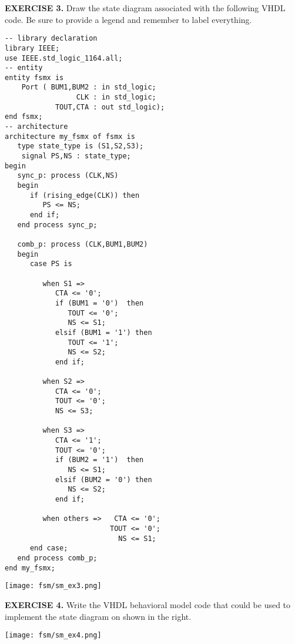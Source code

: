 \vspace{20pt}
\noindent
\begin{minipage}{1\textwidth}
\textbf{EXERCISE 3.}
Draw the state diagram associated with the following VHDL code. Be sure to provide a legend and remember to label everything.
\end{minipage}
\begin{minipage}{0.66\textwidth}
\vspace{10px}
\begin{lstlisting}
-- library declaration
library IEEE;
use IEEE.std_logic_1164.all;
-- entity
entity fsmx is
    Port ( BUM1,BUM2 : in std_logic;
                 CLK : in std_logic;
            TOUT,CTA : out std_logic);
end fsmx;
-- architecture
architecture my_fsmx of fsmx is
   type state_type is (S1,S2,S3); 
	signal PS,NS : state_type; 
begin
   sync_p: process (CLK,NS)
   begin
      if (rising_edge(CLK)) then   
         PS <= NS; 
      end if; 
   end process sync_p; 

   comb_p: process (CLK,BUM1,BUM2)
   begin
      case PS is 

         when S1 => 
            CTA <= '0'; 
            if (BUM1 = '0')  then 
               TOUT <= '0'; 
               NS <= S1; 
            elsif (BUM1 = '1') then 
               TOUT <= '1';  
               NS <= S2; 
            end if; 

         when S2 =>
            CTA <= '0'; 
            TOUT <= '0'; 
            NS <= S3;   

         when S3 =>
            CTA <= '1'; 
            TOUT <= '0';   
            if (BUM2 = '1')  then 
               NS <= S1; 
            elsif (BUM2 = '0') then 
               NS <= S2; 
            end if; 
      
         when others =>   CTA <= '0'; 
                         TOUT <= '0';
                           NS <= S1;
      end case; 
   end process comb_p; 
end my_fsmx;
\end{lstlisting}
\end{minipage}
\begin{minipage}{0.29\textwidth}
\texttt{[image: fsm/sm\_ex3.png]}
\vspace{250px}
\end{minipage}

\vspace{20pt}
\noindent
\begin{minipage}[t]{0.5\textwidth}
\textbf{EXERCISE 4.}
Write the VHDL behavioral model code that could be used to implement the state diagram on shown in the right.
\end{minipage}
\begin{minipage}[t]{0.47\textwidth}
\vspace{0pt}\raggedright
\centering
\texttt{[image: fsm/sm\_ex4.png]}
\end{minipage}


